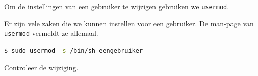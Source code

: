 Om de instellingen van een gebruiker te wijzigen gebruiken we \texttt{usermod}.

Er zijn vele zaken die we kunnen instellen voor een gebruiker. De man-page van \texttt{usermod} vermeldt ze allemaal.

\begin{lstlisting}[language=bash]
$ sudo usermod -s /bin/sh eengebruiker
\end{lstlisting}

Controleer de wijziging.

